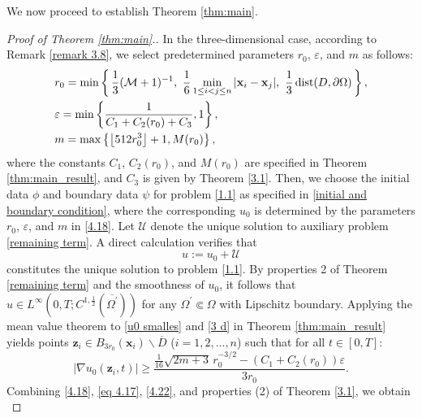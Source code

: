 \documentclass[11pt,reqno,oneside]{amsart}
\numberwithin{equation}{section}
\theoremstyle{definition}
\theoremstyle{remark}
\numberwithin{equation}{section}
\begin{document}
	
	We now proceed to establish Theorem \ref{thm:main}.
	\begin{proof}[Proof of Theorem \ref{thm:main}.]
		In the three-dimensional case, according to Remark \ref{remark 3.8}, we select predetermined parameters $r_0$, $\varepsilon$, and $m$ as follows:
		\begin{equation}\label{4.18}
			\begin{aligned}
				&\hfill r_0 = \min\left\{\,
				\frac{1}{3}(\mathcal{M} + 1)^{-1},\ 
				\frac{1}{6}\min_{1 \le i < j \le n} |\mathbf{x}_i - \mathbf{x}_j|,\ 
				\frac{1}{3}\operatorname{dist}(D, \partial \Omega)
				\,\right\}, \\
				&\hfill \varepsilon = \min\left\{\frac{1}{C_1 + C_2(r_0) + C_3},1\right\}, \\
				&\hfill m = \max\left\{ \left\lfloor 512 r_0^3 \right\rfloor + 1,  M(r_0) \right\},
			\end{aligned}
		\end{equation}
		where the constants $C_1$, $C_2(r_0)$, and $M(r_0)$ are specified in Theorem \ref{thm:main_result}, and $C_3$ is given by Theorem \ref{3.1}. Then, we choose the initial data $\phi$ and boundary data $\psi$ for problem \eqref{1.1} as specified in \eqref{initial and boundary condition}, where the corresponding $u_0$ is determined by the parameters $r_0$, $\varepsilon$, and $m$ in \eqref{4.18}. Let $\mathcal{U}$ denote the unique solution to auxiliary problem \eqref{remaining term}. A direct calculation verifies that 
		\begin{equation}\label{eq 4.17}
			u := u_0 + \mathcal{U}
		\end{equation}	
		constitutes the unique solution to problem \eqref{1.1}. By properties 2 of Theorem \ref{remaining term} and the smoothness of $u_0$, it follows that $u \in L^\infty(0,T;C^{1,\frac{1}{2}}(\overline{\Omega^\prime}))$ for any $\Omega^\prime \Subset \Omega$ with Lipschitz boundary. Applying the mean value theorem to \eqref{u0 smalles} and \eqref{3 d} in Theorem \ref{thm:main_result} yields points $\mathbf{z}_i \in B_{3r_0}(\mathbf{x}_i) \backslash \overline{D}$ ($i=1,2,\dots,n$) such that for all $t \in [0,T]$:
		\begin{equation}\label{4.22}
			|\nabla u_0(\mathbf{z}_i,t)| \geqslant \frac{
				\tfrac{1}{16}\sqrt{2m+3} \, r_0^{-3/2} - \left(C_1 + C_2(r_0)\right)\varepsilon
			}{3r_0}.
		\end{equation}
		Combining \eqref{4.18}, \eqref{eq 4.17}, \eqref{4.22}, and properties (2) of Theorem \ref{3.1}, we obtain
		\begin{equation}\label{large gradient of u}

\end{equation}
\end{proof}
\end{document}
